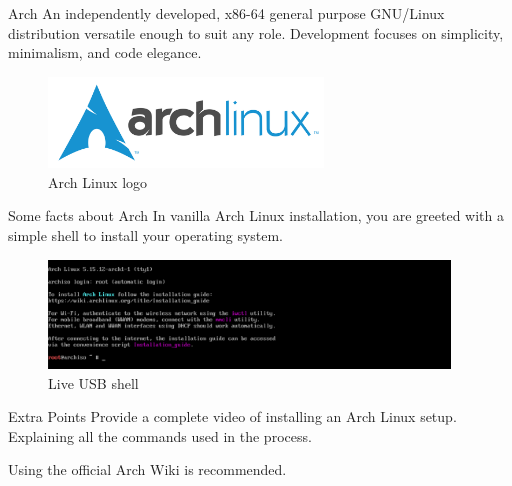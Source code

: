 \documentclass{beamer}
\begin{document}
\begin{frame}{Arch}
		 An independently developed, x86-64 general purpose GNU/Linux distribution 
		 versatile enough to suit any role. Development focuses on simplicity, minimalism,
		 and code elegance.
		\begin{figure}
			\begin{center}
				\includegraphics[width=0.65\textwidth]{images/arch-logo.png}
			\end{center}
			\caption{Arch Linux logo}
		\end{figure}
\end{frame}

\begin{frame}{Some facts about Arch}
		In vanilla Arch Linux installation, you are greeted with a simple shell to install
		your operating system.
		\begin{figure}
			\begin{center}
				\includegraphics[width=0.95\textwidth]{images/arch-live.png}
			\end{center}
			\caption{Live USB shell}
		\end{figure}
\end{frame}

\begin{frame}{Extra Points}
		Provide a complete video of installing an Arch Linux setup. Explaining all the commands
		used in the process.

		Using the official Arch Wiki is recommended.
\end{frame}
\end{document}
